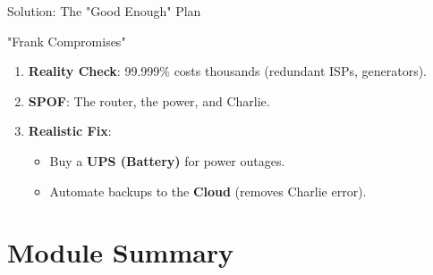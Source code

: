 \documentclass[aspectratio=169]{beamer}  %
\begin{document}
\begin{frame}{Solution: The "Good Enough" Plan}
    \begin{casesolution}{"Frank Compromises"}
        \small
        \begin{enumerate}
            \item \textbf{Reality Check}: 99.999\% costs thousands (redundant ISPs, generators).
            \item \textbf{SPOF}: The router, the power, and Charlie.
            \item \textbf{Realistic Fix}: 
            \begin{itemize}
                \item Buy a \textbf{UPS (Battery)} for power outages.
                \item Automate backups to the \textbf{Cloud} (removes Charlie error).
            \end{itemize}
        \end{enumerate}
    \end{casesolution}
    \begin{center}
    \end{center}
\end{frame}

\section*{Module Summary}
\end{document}

